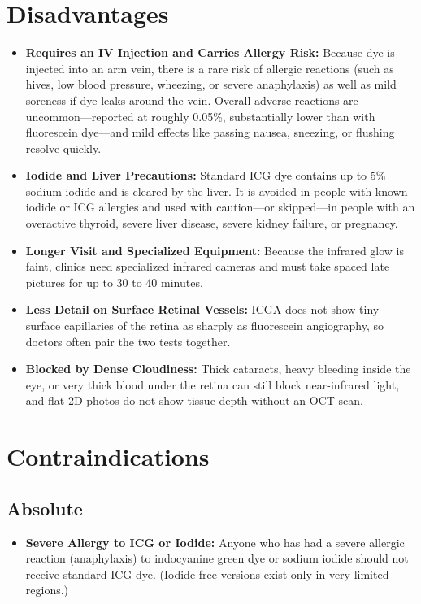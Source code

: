 \section{Disadvantages}

\begin{itemize}
    \item \textbf{Requires an IV Injection and Carries Allergy Risk:} Because dye is injected into an arm vein, there is a rare risk of allergic reactions (such as hives, low blood pressure, wheezing, or severe anaphylaxis) as well as mild soreness if dye leaks around the vein. Overall adverse reactions are uncommon---reported at roughly 0.05\%, substantially lower than with fluorescein dye---and mild effects like passing nausea, sneezing, or flushing resolve quickly.
    \item \textbf{Iodide and Liver Precautions:} Standard ICG dye contains up to 5\% sodium iodide and is cleared by the liver. It is avoided in people with known iodide or ICG allergies and used with caution---or skipped---in people with an overactive thyroid, severe liver disease, severe kidney failure, or pregnancy.
    \item \textbf{Longer Visit and Specialized Equipment:} Because the infrared glow is faint, clinics need specialized infrared cameras and must take spaced late pictures for up to 30 to 40 minutes.
    \item \textbf{Less Detail on Surface Retinal Vessels:} ICGA does not show tiny surface capillaries of the retina as sharply as fluorescein angiography, so doctors often pair the two tests together.
    \item \textbf{Blocked by Dense Cloudiness:} Thick cataracts, heavy bleeding inside the eye, or very thick blood under the retina can still block near-infrared light, and flat 2D photos do not show tissue depth without an OCT scan.
\end{itemize}

\section{Contraindications}

\subsection{Absolute}

\begin{itemize}
    \item \textbf{Severe Allergy to ICG or Iodide:} Anyone who has had a severe allergic reaction (anaphylaxis) to indocyanine green dye or sodium iodide should not receive standard ICG dye. (Iodide-free versions exist only in very limited regions.)
\end{itemize}

